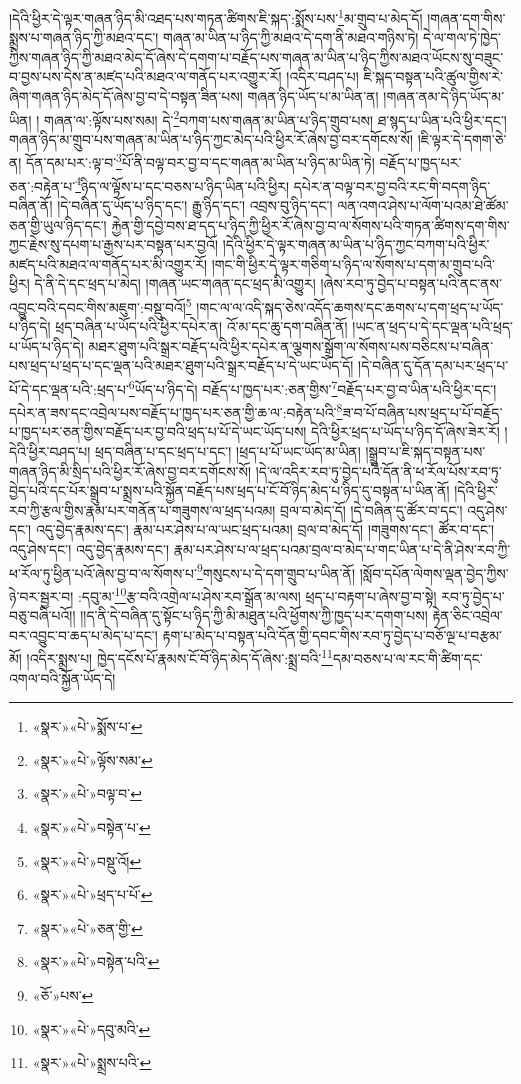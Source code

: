 །དེའི་ཕྱིར་དེ་ལྟར་གཞན་ཉིད་མི་འཐད་པས་གཏན་ཚིགས་ཇི་སྐད་:སྨོས་པས་\footnote{«སྣར་»«པེ་»སྨོས་པ་}མ་གྲུབ་པ་མེད་དོ། །གཞན་དག་གིས་སྨྲས་པ་གཞན་ཉིད་ཀྱི་མཐའ་དང་། གཞན་མ་ཡིན་པ་ཉིད་ཀྱི་མཐའ་དེ་དག་ནི་མཐའ་གཉིས་ཏེ། དེ་ལ་གལ་ཏེ་ཁྱེད་ཀྱིས་གཞན་ཉིད་ཀྱི་མཐའ་མེད་དོ་ཞེས་དེ་དགག་པ་བརྗོད་པས་གཞན་མ་ཡིན་པ་ཉིད་ཀྱིས་མཐའ་ཡོངས་སུ་བཟུང་བ་བྱས་པས་དེས་ན་མཛད་པའི་མཐའ་ལ་གནོད་པར་འགྱུར་རོ། །འདིར་བཤད་པ། ཇི་སྐད་བསྟན་པའི་ཚུལ་གྱིས་རེ་ཞིག་གཞན་ཉིད་མེད་དོ་ཞེས་བྱ་བ་དེ་བསྟན་ཟིན་པས། གཞན་ཉིད་ཡོད་པ་མ་ཡིན་ན། །གཞན་ནམ་དེ་ཉིད་ཡོད་མ་ཡིན། །
གཞན་ལ་:ལྟོས་པས་སམ། དེ་\footnote{«སྣར་»«པེ་»ལྟོས་སམ་}བཀག་པས་གཞན་མ་ཡིན་པ་ཉིད་གྲུབ་པས། ཐ་སྙད་པ་ཡིན་པའི་ཕྱིར་དང་། གཞན་ཉིད་མ་གྲུབ་པས་གཞན་མ་ཡིན་པ་ཉིད་ཀྱང་མེད་པའི་ཕྱིར་རོ་ཞེས་བྱ་བར་དགོངས་སོ། །ཇི་ལྟར་དེ་དགག་ཅེ་ན། དོན་དམ་པར་:ལྟ་བ་\footnote{«སྣར་»«པེ་»བལྟ་བ་}པོ་ནི་བལྟ་བར་བྱ་བ་དང་གཞན་མ་ཡིན་པ་ཉིད་མ་ཡིན་ཏེ། བརྗོད་པ་ཁྱད་པར་ཅན་:བརྟེན་པ་\footnote{«སྣར་»«པེ་»བསྟེན་པ་}ཉིད་ལ་ལྟོས་པ་དང་བཅས་པ་ཉིད་ཡིན་པའི་ཕྱིར། དཔེར་ན་བལྟ་བར་བྱ་བའི་རང་གི་བདག་ཉིད་བཞིན་ནོ། །དེ་བཞིན་དུ་ཡོད་པ་ཉིད་དང་། རྒྱུ་ཉིད་དང་། འབྲས་བུ་ཉིད་དང་། ལན་འགའ་ཤེས་པ་ལོག་པའམ་ཐེ་ཚོམ་ཅན་གྱི་ཡུལ་ཉིད་དང་། རྐྱེན་གྱི་དབྱེ་བས་ཐ་དད་པ་ཉིད་ཀྱི་ཕྱིར་རོ་ཞེས་བྱ་བ་ལ་སོགས་པའི་གཏན་ཚིགས་དག་གིས་ཀྱང་རྗེས་སུ་དཔག་པ་རྒྱས་པར་བསྟན་པར་བྱའོ། །དེའི་ཕྱིར་དེ་ལྟར་གཞན་མ་ཡིན་པ་ཉིད་ཀྱང་བཀག་པའི་ཕྱིར་མཛད་པའི་མཐའ་ལ་གནོད་པར་མི་འགྱུར་རོ། །གང་གི་ཕྱིར་དེ་ལྟར་གཅིག་པ་ཉིད་ལ་སོགས་པ་དག་མ་གྲུབ་པའི་ཕྱིར། དེ་ནི་དེ་དང་ཕྲད་པ་མེད། །གཞན་ཡང་གཞན་དང་ཕྲད་མི་འགྱུར། །ཞེས་རབ་ཏུ་བྱེད་པ་བསྟན་པའི་ནང་ནས་འབྱུང་བའི་དབང་གིས་མཇུག་:བསྡུ་བའོ།\footnote{«སྣར་»«པེ་»བསྡུ་འོ།} །གང་ལ་ལ་འདི་སྐད་ཅེས་འདོད་ཆགས་དང་ཆགས་པ་དག་ཕྲད་པ་ཡོད་པ་ཉིད་དེ། ཕྲད་བཞིན་པ་ཡོད་པའི་ཕྱིར་དཔེར་ན། འོ་མ་དང་ཆུ་དག་བཞིན་ནོ། །ཡང་ན་ཕྲད་པ་དེ་དང་ལྡན་པའི་ཕྲད་པ་ཡོད་པ་ཉིད་དེ། མཐར་ཐུག་པའི་སྒྲར་བརྗོད་པའི་ཕྱིར་དཔེར་ན་ལྕགས་སྒྲོག་ལ་སོགས་པས་བཅིངས་པ་བཞིན་པས་ཕྲད་པ་ཕྲད་པ་དང་ལྡན་པའི་མཐར་ཐུག་པའི་སྒྲར་བརྗོད་པ་དེ་ཡང་ཡོད་དོ། །དེ་བཞིན་དུ་དོན་དམ་པར་ཕྲད་པ་པོ་དེ་དང་ལྡན་པའི་:ཕྲད་པ་\footnote{«སྣར་»«པེ་»ཕྲད་པ་པོ་}ཡོད་པ་ཉིད་དེ། བརྗོད་པ་ཁྱད་པར་:ཅན་གྱིས་\footnote{«སྣར་»«པེ་»ཅན་གྱི་}བརྗོད་པར་བྱ་བ་ཡིན་པའི་ཕྱིར་དང་། དཔེར་ན་ཟས་དང་འབྲེལ་པས་བརྗོད་པ་ཁྱད་པར་ཅན་གྱི་ཆ་ལ་:བརྟེན་པའི་\footnote{«སྣར་»«པེ་»བསྟེན་པའི་}ཟ་བ་པོ་བཞིན་པས་ཕྲད་པ་པོ་བརྗོད་པ་ཁྱད་པར་ཅན་གྱིས་བརྗོད་པར་བྱ་བའི་ཕྲད་པ་པོ་དེ་ཡང་ཡོད་པས། དེའི་ཕྱིར་ཕྲད་པ་ཡོད་པ་ཉིད་དོ་ཞེས་ཟེར་རོ། །དེའི་ཕྱིར་བཤད་པ། ཕྲད་བཞིན་པ་དང་ཕྲད་པ་དང་། །ཕྲད་པ་པོ་ཡང་ཡོད་མ་ཡིན། །སྒྲུབ་པ་ཇི་སྐད་བསྟན་པས་གཞན་ཉིད་མི་སྲིད་པའི་ཕྱིར་རོ་ཞེས་བྱ་བར་དགོངས་སོ། །དེ་ལ་འདིར་རབ་ཏུ་བྱེད་པའི་དོན་ནི་ཕ་རོལ་པོས་རབ་ཏུ་བྱེད་པའི་དང་པོར་སྒྲུབ་པ་སྨྲས་པའི་སྐྱོན་བརྗོད་པས་ཕྲད་པ་ངོ་བོ་ཉིད་མེད་པ་ཉིད་དུ་བསྟན་པ་ཡིན་ནོ། །དེའི་ཕྱིར་རབ་ཀྱི་རྩལ་གྱིས་རྣམ་པར་གནོན་པ་གཟུགས་ལ་ཕྲད་པའམ། བྲལ་བ་མེད་དོ། །དེ་བཞིན་དུ་ཚོར་བ་དང་། འདུ་ཤེས་དང་། འདུ་བྱེད་རྣམས་དང་། རྣམ་པར་ཤེས་པ་ལ་ཡང་ཕྲད་པའམ། བྲལ་བ་མེད་དོ། །གཟུགས་དང་། ཚོར་བ་དང་། འདུ་ཤེས་དང་། འདུ་བྱེད་རྣམས་དང་། རྣམ་པར་ཤེས་པ་ལ་ཕྲད་པའམ་བྲལ་བ་མེད་པ་གང་ཡིན་པ་དེ་ནི་ཤེས་རབ་ཀྱི་ཕ་རོལ་ཏུ་ཕྱིན་པའོ་ཞེས་བྱ་བ་ལ་སོགས་པ་\footnote{«ཅོ་»པས་}གསུངས་པ་དེ་དག་གྲུབ་པ་ཡིན་ནོ། །སློབ་དཔོན་ལེགས་ལྡན་བྱེད་ཀྱིས་ཉེ་བར་སྦྱར་བ། :དབུ་མ་\footnote{«སྣར་»«པེ་»དབུ་མའི་}རྩ་བའི་འགྲེལ་པ་ཤེས་རབ་སྒྲོན་མ་ལས། ཕྲད་པ་བརྟག་པ་ཞེས་བྱ་བ་སྟེ། རབ་ཏུ་བྱེད་པ་བཅུ་བཞི་པའོ།། །།ད་ནི་དེ་བཞིན་དུ་སྟོང་པ་ཉིད་ཀྱི་མི་མཐུན་པའི་ཕྱོགས་ཀྱི་ཁྱད་པར་དགག་པས། རྟེན་ཅིང་འབྲེལ་བར་འབྱུང་བ་ཆད་པ་མེད་པ་དང་། རྟག་པ་མེད་པ་བསྟན་པའི་དོན་གྱི་དབང་གིས་རབ་ཏུ་བྱེད་པ་བཅོ་ལྔ་པ་བརྩམ་མོ། །འདིར་སྨྲས་པ། ཁྱེད་དངོས་པོ་རྣམས་ངོ་བོ་ཉིད་མེད་དོ་ཞེས་:སྨྲ་བའི་\footnote{«སྣར་»«པེ་»སྨྲས་པའི་}དམ་བཅས་པ་ལ་རང་གི་ཚིག་དང་འགལ་བའི་སྐྱོན་ཡོད་དེ། 